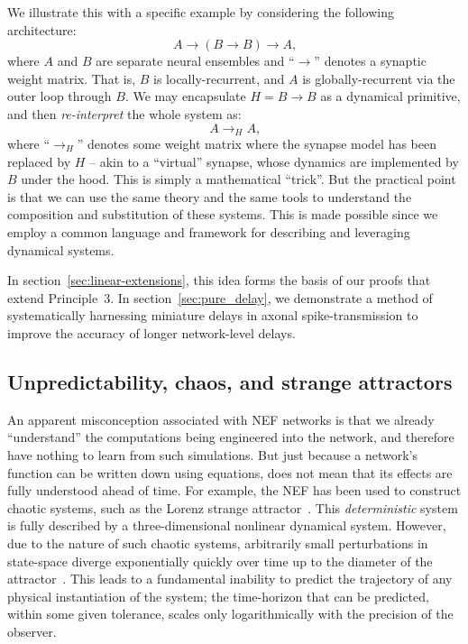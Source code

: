We illustrate this with a specific example by considering the following architecture:
$$A \rightarrow (B \rightarrow B) \rightarrow A \text{,}$$
where $A$ and $B$ are separate neural ensembles and ``$\rightarrow$'' denotes a synaptic weight matrix.
That is, $B$ is locally-recurrent, and $A$ is globally-recurrent via the outer loop through $B$.
We may encapsulate $H = B \rightarrow B$ as a dynamical primitive, and then \emph{re-interpret} the whole system as:
$$A \rightarrow_H A \text{,}$$
where ``$\rightarrow_H$'' denotes some weight matrix where the synapse model has been replaced by $H$ --
akin to a ``virtual'' synapse, whose dynamics are implemented by $B$ under the hood.
This is simply a mathematical ``trick''.
But the practical point is that we can use the same theory and the same tools to understand the composition and substitution of these systems.
This is made possible since we employ a common language and framework for describing and leveraging dynamical systems.

In section~\ref{sec:linear-extensions}, this idea forms the basis of our proofs that extend Principle~3.
In section~\ref{sec:pure_delay}, we demonstrate a method of systematically harnessing miniature delays in axonal spike-transmission to improve the accuracy of longer network-level delays.


\subsection{Unpredictability, chaos, and strange attractors}

An apparent misconception associated with NEF networks is that we already ``understand'' the computations being engineered into the network, and therefore have nothing to learn from such simulations.
But just because a network's function can be written down using equations, does not mean that its effects are fully understood ahead of time.
For example, the NEF has been used to construct chaotic systems, such as the Lorenz strange attractor~\citep{eliasmith2005b}.
This \emph{deterministic} system is fully described by a three-dimensional nonlinear dynamical system.
However, due to the nature of such chaotic systems, arbitrarily small perturbations in state-space diverge exponentially quickly over time up to the diameter of the attractor~\citep[][pp.~328--330]{strogatz2000nonlinear}.
This leads to a fundamental inability to predict the trajectory of any physical instantiation of the system; the time-horizon that can be predicted, within some given tolerance, scales only logarithmically with the precision of the observer.


